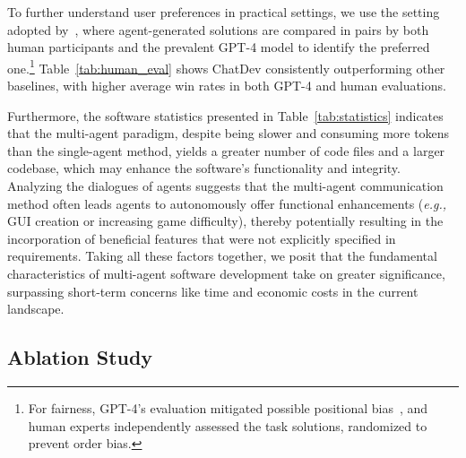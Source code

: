 \documentclass[11pt]{article}
\newcommand{\eg}{\textit{e.g., }}
\begin{document}
To further understand user preferences in practical settings, we use the setting adopted by~\citet{li2023camel}, where agent-generated solutions are compared in pairs by both human participants and the prevalent GPT-4 model to identify the preferred one.\footnote{For fairness, GPT-4's evaluation mitigated possible positional bias~\cite{wang2023largelanguage}, and human experts independently assessed the task solutions, randomized to prevent order bias.} Table~\ref{tab:human_eval} shows ChatDev consistently outperforming other baselines, with higher average win rates in both GPT-4 and human evaluations.


Furthermore, the software statistics presented in Table~\ref{tab:statistics} indicates that the multi-agent paradigm, despite being slower and consuming more tokens than the single-agent method, yields a greater number of code files and a larger codebase, which may enhance the software's functionality and integrity.
Analyzing the dialogues of agents suggests that the multi-agent communication method often leads agents to autonomously offer functional enhancements (\eg GUI creation or increasing game difficulty), thereby potentially resulting in the incorporation of beneficial features that were not explicitly specified in requirements.
Taking all these factors together, we posit that the fundamental characteristics of multi-agent software development take on greater significance, surpassing short-term concerns like time and economic costs in the current landscape.


\subsection{Ablation Study}

\begin{table}[t]
\centering
{}
\caption{Ablation study on main components or mechanisms. $\leq x$ denotes halting the chat chain after the completion of the $x$ phrase, and $\diagdown$ denotes the removing operation. CDH denotes the communicative dehallucination mechanism.}
\label{tab:ablation}
\end{table}
\end{document}
